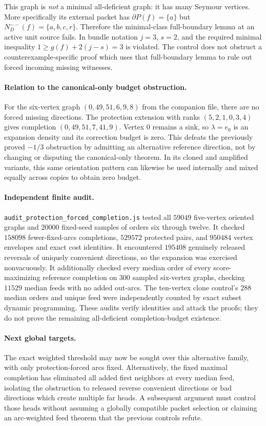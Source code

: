 This graph is \emph{not} a minimal all-deficient graph: it has many
Seymour vertices. More specifically its external packet has
$\partial P(f)=\{a\}$ but $N_D^{--}(f)=\{a,b,c,r\}$. Therefore
the minimal-class full-boundary lemma at an active unit source fails.
In bundle notation $j=3$, $s=2$, and the required minimal inequality
$1\ge g(f)+2(j-s)=3$ is violated. The control does not obstruct a
counterexample-specific proof which uses that full-boundary lemma
to rule out forced incoming missing witnesses.

\paragraph{Relation to the canonical-only budget obstruction.}
For the six-vertex graph $(0,49,51,6,9,8)$ from the companion file,
there are no forced missing directions. The protection extension with
ranks $(5,2,1,0,3,4)$ gives completion $(0,49,51,7,41,9)$.
Vertex $0$ remains a sink, so $\lambda=e_0$ is an expansion density
and its correction budget is zero. This defeats the previously proved
$-1/3$ obstruction by admitting an alternative reference direction, not by changing
or disputing the canonical-only theorem. In its cloned and amplified
variants, this same orientation pattern can likewise be used internally
and mixed equally across copies to obtain zero budget.

\paragraph{Independent finite audit.}
\texttt{audit\_protection\_forced\_completion.js} tested all $59049$
five-vertex oriented graphs and $20000$ fixed-seed samples of orders
six through twelve. It checked $158098$ fewer-fixed-arcs completions,
$529572$ protected pairs, and $950484$ vertex envelopes and exact
cost identities. It encountered $195408$ genuinely released reversals
of uniquely convenient directions, so the expansion was exercised
nonvacuously. It additionally checked every median order of every
score-maximizing reference completion on $300$ sampled six-vertex
graphs, checking $11529$ median feeds with no added out-arcs.
The ten-vertex clone control's $288$ median orders and unique feed
were independently counted by exact subset dynamic programming.
These audits verify identities and attack the proofs; they do
not prove the remaining all-deficient completion-budget existence.

\paragraph{Next global targets.}
The exact weighted threshold may now be sought over this alternative
family, with only protection-forced arcs fixed. Alternatively, the
fixed maximal completion has eliminated all added first neighbors
at every median feed, isolating the obstruction to released reverse
convenient directions or bad directions which create multiple far
heads. A subsequent argument must control those heads without
assuming a globally compatible packet selection or claiming an
arc-weighted feed theorem that the previous controls refute.
